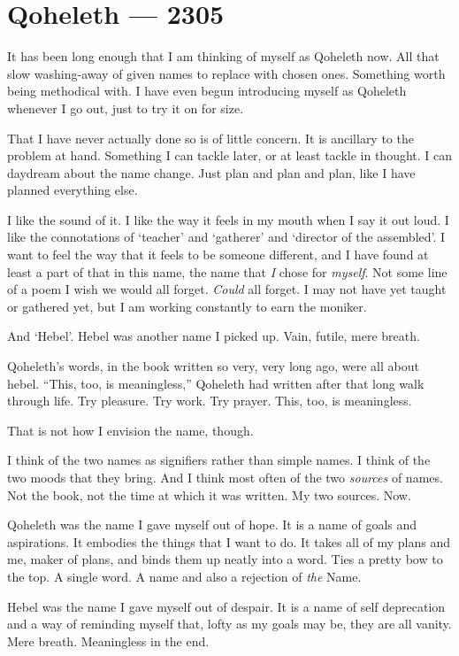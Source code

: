 \hypertarget{qoheleth-2305}{%
\chapter*{Qoheleth — 2305}\label{qoheleth-2305}}

It has been long enough that I am thinking of myself as Qoheleth now. All that slow washing-away of given names to replace with chosen ones. Something worth being methodical with. I have even begun introducing myself as Qoheleth whenever I go out, just to try it on for size.

That I have never actually done so is of little concern. It is ancillary to the problem at hand. Something I can tackle later, or at least tackle in thought. I can daydream about the name change. Just plan and plan and plan, like I have planned everything else.

I like the sound of it. I like the way it feels in my mouth when I say it out loud. I like the connotations of `teacher' and `gatherer' and `director of the assembled'. I want to feel the way that it feels to be someone different, and I have found at least a part of that in this name, the name that \emph{I} chose for \emph{myself}. Not some line of a poem I wish we would all forget. \emph{Could} all forget. I may not have yet taught or gathered yet, but I am working constantly to earn the moniker.

And `Hebel'. Hebel was another name I picked up. Vain, futile, mere breath.

Qoheleth's words, in the book written so very, very long ago, were all about hebel. ``This, too, is meaningless,'' Qoheleth had written after that long walk through life. Try pleasure. Try work. Try prayer. This, too, is meaningless.

That is not how I envision the name, though.

I think of the two names as signifiers rather than simple names. I think of the two moods that they bring. And I think most often of the two \emph{sources} of names. Not the book, not the time at which it was written. My two sources. Now.

Qoheleth was the name I gave myself out of hope. It is a name of goals and aspirations. It embodies the things that I want to do. It takes all of my plans and me, maker of plans, and binds them up neatly into a word. Ties a pretty bow to the top. A single word. A name and also a rejection of \emph{the} Name.

Hebel was the name I gave myself out of despair. It is a name of self deprecation and a way of reminding myself that, lofty as my goals may be, they are all vanity. Mere breath. Meaningless in the end.

